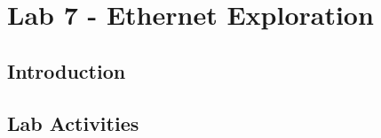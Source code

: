 \section{Lab 7 - Ethernet Exploration}

\subsection{Introduction}

\subsection{Lab Activities}

\subsubsection{}


\subsubsection{}


